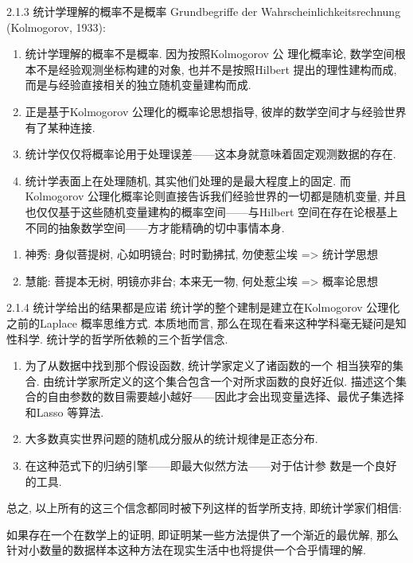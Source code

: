\documentclass[compress,10pt,dvipsnames,notheorems]{beamer} %
\begin{document}
\begin{frame}{2.1.3 统计学理解的概率不是概率}
Grundbegriffe der Wahrscheinlichkeitsrechnung (Kolmogorov, 1933):

\begin{solu}
\begin{enumerate}
\item 统计学理解的概率不是概率. 因为按照Kolmogorov 公
理化概率论, 数学空间根本不是经验观测坐标构建的对象, 也并不是按照Hilbert
提出的理性建构而成, 而是与经验直接相关的独立随机变量建构而成.
\item 正是基于Kolmogorov 公理化的概率论思想指导, 彼岸的数学空间才与经验世界有了某种连接.
\item 统计学仅仅将概率论用于处理误差——这本身就意味着固定观测数据的存在. 
\item 统计学表面上在处理随机, 其实他们处理的是最大程度上的固定. 而Kolmogorov 公理化概率论则直接告诉我们经验世界的一切都是随机变量, 并且也仅仅基于这些随机变量建构的概率空间——与Hilbert 空间在存在论根基上不同的抽象数学空间——方才能精确的切中事情本身.
\end{enumerate}
\end{solu}
\pause
\begin{enumerate}
\item 神秀: 身似菩提树, 心如明镜台; 时时勤拂拭, 勿使惹尘埃 => 统计学思想
\item 慧能: 菩提本无树, 明镜亦非台; 本来无一物, 何处惹尘埃 => 概率论思想
\end{enumerate}
\end{frame}



\begin{frame}{2.1.4 统计学给出的结果都是应诺}
统计学的整个建制是建立在Kolmogorov 公理化之前的Laplace 概率思维方式. 本质地而言, 那么在现在看来这种学科毫无疑问是知性科学. 统计学的哲学所依赖的三个哲学信念.

\begin{solu}
\begin{enumerate}
\item 为了从数据中找到那个假设函数, 统计学家定义了诸函数的一个
相当狭窄的集合. 由统计学家所定义的这个集合包含一个对所求函数的良好近似. 描述这个集合的自由参数的数目需要越小越好——因此才会出现变量选择、最优子集选择和Lasso 等算法.
\item 大多数真实世界问题的随机成分服从的统计规律是正态分布.
\item 在这种范式下的归纳引擎——即最大似然方法——对于估计参
数是一个良好的工具.
\end{enumerate}
\end{solu}

总之, 以上所有的这三个信念都同时被下列这样的哲学所支持, 即统计学家们相信:

\begin{solu}
如果存在一个在数学上的证明, 即证明某一些方法提供了一个渐近的最优解, 那么针对小数量的数据样本这种方法在现实生活中也将提供一个合乎情理的解.
\end{solu}
\end{frame}
\end{document}
